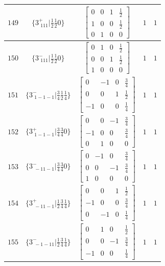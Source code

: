 \documentclass[fleqn,8pt]{jsarticle}
\begin{document}
\begin{longtable}{ccccc}
$ 149 $ & $ \{3^{+}_{\,\,111}|\frac{1}{2} \frac{1}{2} 0\} $ & $ \begin{bmatrix} 0 & 0 & 1 & \frac{1}{2} \\ 1 & 0 & 0 & \frac{1}{2} \\ 0 & 1 & 0 & 0 \end{bmatrix} $ & $ 1 $ & $ 1 $ \\ \hline
$ 150 $ & $ \{3^{-}_{\,\,111}|\frac{1}{2} \frac{1}{2} 0\} $ & $ \begin{bmatrix} 0 & 1 & 0 & \frac{1}{2} \\ 0 & 0 & 1 & \frac{1}{2} \\ 1 & 0 & 0 & 0 \end{bmatrix} $ & $ 1 $ & $ 1 $ \\ \hline
$ 151 $ & $ \{3^{-}_{\,\,1-1-1}|\frac{3}{4} \frac{1}{2} \frac{1}{4}\} $ & $ \begin{bmatrix} 0 & -1 & 0 & \frac{3}{4} \\ 0 & 0 & 1 & \frac{1}{2} \\ -1 & 0 & 0 & \frac{1}{4} \end{bmatrix} $ & $ 1 $ & $ 1 $ \\ \hline
$ 152 $ & $ \{3^{+}_{\,\,1-1-1}|\frac{3}{4} \frac{3}{4} 0\} $ & $ \begin{bmatrix} 0 & 0 & -1 & \frac{3}{4} \\ -1 & 0 & 0 & \frac{3}{4} \\ 0 & 1 & 0 & 0 \end{bmatrix} $ & $ 1 $ & $ 1 $ \\ \hline
$ 153 $ & $ \{3^{-}_{\,\,-11-1}|\frac{3}{4} \frac{3}{4} 0\} $ & $ \begin{bmatrix} 0 & -1 & 0 & \frac{3}{4} \\ 0 & 0 & -1 & \frac{3}{4} \\ 1 & 0 & 0 & 0 \end{bmatrix} $ & $ 1 $ & $ 1 $ \\ \hline
$ 154 $ & $ \{3^{+}_{\,\,-11-1}|\frac{1}{2} \frac{3}{4} \frac{1}{4}\} $ & $ \begin{bmatrix} 0 & 0 & 1 & \frac{1}{2} \\ -1 & 0 & 0 & \frac{3}{4} \\ 0 & -1 & 0 & \frac{1}{4} \end{bmatrix} $ & $ 1 $ & $ 1 $ \\ \hline
$ 155 $ & $ \{3^{-}_{\,\,-1-11}|\frac{1}{2} \frac{3}{4} \frac{1}{4}\} $ & $ \begin{bmatrix} 0 & 1 & 0 & \frac{1}{2} \\ 0 & 0 & -1 & \frac{3}{4} \\ -1 & 0 & 0 & \frac{1}{4} \end{bmatrix} $ & $ 1 $ & $ 1 $ \\ \hline

\end{longtable}
\end{document}
